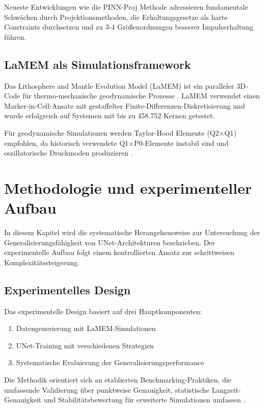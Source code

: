 \documentclass[12pt,twoside,openright]{scrreprt}
\theoremstyle{definition}
\theoremstyle{plain}
\begin{document}
Neueste Entwicklungen wie die PINN-Proj Methode adressieren fundamentale Schwächen durch Projektionsmethoden, die Erhaltungsgesetze als harte Constraints durchsetzen und zu 3-4 Größenordnungen besserer Impulserhaltung führen.

\section{LaMEM als Simulationsframework}

Das Lithosphere and Mantle Evolution Model (LaMEM) ist ein paralleler 3D-Code für thermo-mechanische geodynamische Prozesse \parencite{lamem_github}. LaMEM verwendet einen Marker-in-Cell-Ansatz mit gestaffelter Finite-Differenzen-Diskretisierung und wurde erfolgreich auf Systemen mit bis zu 458.752 Kernen getestet.

Für geodynamische Simulationen werden Taylor-Hood Elemente (Q2×Q1) empfohlen, da historisch verwendete Q1×P0-Elemente instabil sind und oszillatorische Druckmoden produzieren \parencite{thieulot2022finite}.

\chapter{Methodologie und experimenteller Aufbau}
\label{ch:methodology}

In diesem Kapitel wird die systematische Herangehensweise zur Untersuchung der Generalisierungsfähigkeit von UNet-Architekturen beschrieben. Der experimentelle Aufbau folgt einem kontrollierten Ansatz zur schrittweisen Komplexitätssteigerung.

\section{Experimentelles Design}

Das experimentelle Design basiert auf drei Hauptkomponenten:
\begin{enumerate}
	\item Datengenerierung mit LaMEM-Simulationen
	\item UNet-Training mit verschiedenen Strategien
	\item Systematische Evaluierung der Generalisierungsperformance
\end{enumerate}

Die Methodik orientiert sich an etablierten Benchmarking-Praktiken, die umfassende Validierung über punktweise Genauigkeit, statistische Langzeit-Genauigkeit und Stabilitätsbewertung für erweiterte Simulationen umfassen \parencite{cfdbench2023}.
\end{document}
